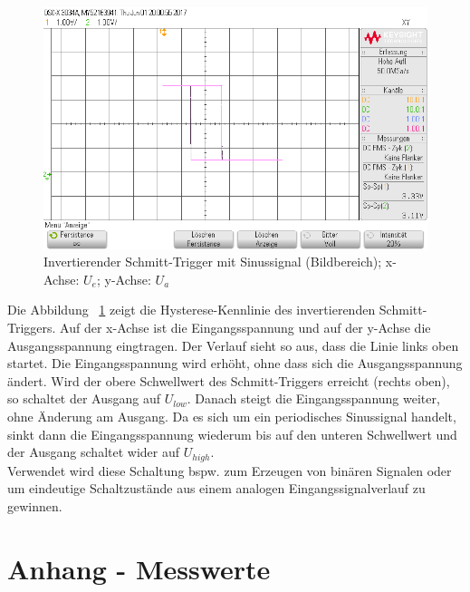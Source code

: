 \documentclass[12pt,a4paper,titlepage]{article}
\begin{document}
\begin{figure}[H]
  \centering
  \includegraphics[width=150mm]{i_schmitt_trigger_sinus_bildbereich.png}
  \caption{Invertierender Schmitt-Trigger mit Sinussignal (Bildbereich); x-Achse: $U_e$; y-Achse: $U_a$}
  \label{figure44}
\end{figure}
\noindent Die Abbildung ~\ref{figure44} zeigt die Hysterese-Kennlinie des invertierenden Schmitt-Triggers. Auf der x-Achse ist die Eingangsspannung und auf der y-Achse die Ausgangsspannung eingtragen. Der Verlauf sieht so aus, dass die Linie links oben startet. Die Eingangsspannung wird erh\"oht, ohne dass sich die Ausgangsspannung \"andert. Wird der obere Schwellwert des Schmitt-Triggers erreicht (rechts oben), so schaltet der Ausgang auf $U_{low}$. Danach steigt die Eingangsspannung weiter, ohne \"Anderung am Ausgang. Da es sich um ein periodisches Sinussignal handelt, sinkt dann die Eingangsspannung wiederum bis auf den unteren Schwellwert und der Ausgang schaltet wider auf $U_{high}$. \\
\noindent Verwendet wird diese Schaltung bspw. zum Erzeugen von bin\"aren Signalen oder um eindeutige Schaltzustände aus einem analogen Eingangssignalverlauf zu gewinnen.



\section{Anhang - Messwerte}
\end{document}
